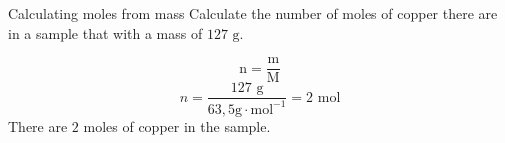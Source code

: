       \begin{wex}{Calculating moles from mass }{
\label{m38717*probfhsst!!!underscore!!!id410}
      \label{m38717*id277635}Calculate the number of moles of copper there are in a sample that with a mass of $127 \text{ g}$. 
      }
{
      \label{m38717*id277680}\nopagebreak\noindent{}
        
    \begin{equation*}
    \text{n}=\frac{\text{m}}{\text{M}}
      \end{equation*}
      \label{m38717*id277705}\nopagebreak\noindent{}
    \begin{equation*}
    n=\frac{127 \text{ g}}{63,5 \text{g} \cdot \text{mol}^{-1}}=2 \text{ mol}
      \end{equation*}
      \label{m38717*id277735}There are $2$ moles of copper in the sample.
}
    \end{wex}
    
